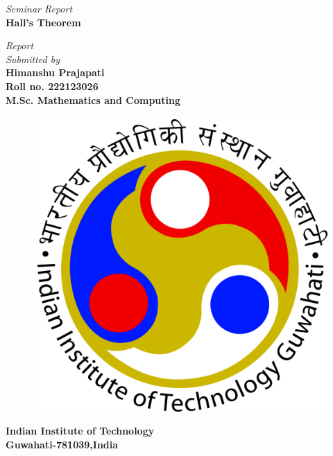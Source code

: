 \documentclass[a4paper,12pt]{report}
\begin{document}
	\begin{titlepage}
		\begin{center}
			\begin{spacing}{1}
				\textit{\large Seminar Report \\}
				\vspace{5mm}
				\textbf{\Large Hall's Theorem}
				\vspace{1cm}
				\vspace{\fill}
			\end{spacing}
			\begin{spacing}{1}
				\textit{\large Report}\\
				\vspace{4mm}
				\textit{Submitted by\\}
				\vspace{4mm}
				\textbf{\large Himanshu Prajapati}\\
				\vspace{2mm}
				\textbf{Roll no. 222123026}\\
				\textbf{M.Sc. Mathematics and Computing}\\
				\vspace{2mm}
				\vspace{\fill}
			\end{spacing}
			
			\begin{figure}[h!]
				\centering
				\includegraphics[scale=0.15]{IITG_logo}
			\end{figure}
			\vspace{0.5cm}
			\begin{spacing}{1}
				\textbf{\Large Indian Institute of Technology \\}
				\vspace{4mm}
				\textbf{\large Guwahati-781039,India \\}
				\vspace{4mm}
			\end{spacing}
		\end{center}
	\end{titlepage}
\end{document}
